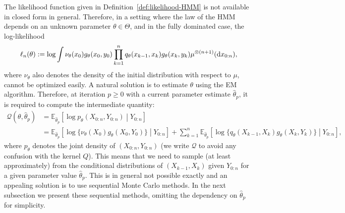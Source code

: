 \documentclass[english,graybox,envcountchap,envcountsame,sectrefs,shortlabels]{svmono}
\theoremstyle{style}
\newcommand{\eqsp}{}
\begin{document}
The likelihood function given in Definition~\ref{def:likelihood-HMM} is not available in closed form in general. Therefore, in a setting where the law of the HMM depends on an unknown parameter $\theta\in\Theta$, and in the fully dominated case, the log-likelihood
$$
\ell_{n}(\theta) := \log
\int \nu_\theta(x_0) g_\theta(x_0, y_0)
\prod_{k=1}^{n} q_\theta(x_{k-1}, x_k) g_\theta(x_k, y_k) \mu^{\otimes (n+1)}(\rmd x_{0:n})\eqsp,
$$
where $\nu_\theta$ also denotes the density of the initial distribution with respect to $\mu$, cannot be optimized easily. A natural solution is to estimate $\theta$ using the EM algorithm. Therefore, at iteration $p\geq 0$ with a current parameter estimate $\widehat \theta_p$, it is required to compute the intermediate quantity:
\begin{align*}
\mathcal{Q}(\theta,\widehat \theta_p) &= \mathbb{E}_{\widehat \theta_p}\left[\log p_\theta(X_{0:n},Y_{0:n})\middle| Y_{0:n}\right]\\
&=  \mathbb{E}_{\widehat \theta_p}\left[\log \{\nu_\theta(X_{0})g_\theta(X_0,Y_0)\}\middle| Y_{0:n}\right] + \sum_{k=1}^n \mathbb{E}_{\widehat \theta_p}\left[\log \{q_\theta(X_{k-1},X_k)g_\theta(X_k,Y_k)\}\middle| Y_{0:n}\right]\eqsp,
\end{align*}
where $p_\theta$ denotes the joint density of $(X_{0:n},Y_{0:n})$ (we write $\mathcal{Q}$ to avoid any confusion with the kernel $Q$).
This means that we need to sample (at least approximately) from the conditional distributions of $(X_{k-1},X_k)$ given $Y_{0:n}$ for a given parameter value $\widehat \theta_p$. This is in general not possible exactly and an appealing solution is to use sequential Monte Carlo methods. In the next subsection we present these sequential methods, omitting the dependency on $\widehat \theta_p$ for simplicity.
\end{document}
